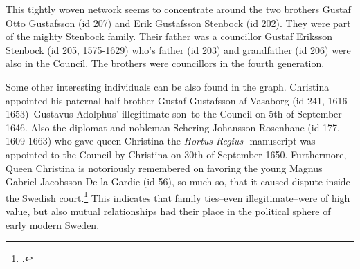 This tightly woven network seems to concentrate around the two brothers Gustaf Otto Gustafsson (id 207) and Erik Gustafsson Stenbock (id 202). They were part of the mighty Stenbock family. Their father was a councillor Gustaf Eriksson Stenbock (id 205, 1575-1629) who's father (id 203) and grandfather (id 206) were also in the Council. The brothers were councillors in the fourth generation. 

Some other interesting individuals can be also found in the graph. Christina appointed his paternal half brother Gustaf Gustafsson af Vasaborg (id 241, 1616-1653)–Gustavus Adolphus' illegitimate son–to the Council on 5th of September 1646. Also the diplomat and nobleman Schering Johansson Rosenhane (id 177, 1609-1663) who gave queen Christina the \textit{Hortus Regius} -manuscript was appointed to the Council by Christina on 30th of September 1650. Furthermore, Queen Christina is notoriously remembered on favoring the young Magnus Gabriel Jacobsson De la Gardie (id 56), so much so, that it caused dispute inside the Swedish court.\footcite{makelaAlitaloEtAl2000} This indicates that family ties–even illegitimate–were of high value, but also mutual relationships had their place in the political sphere of early modern Sweden.
